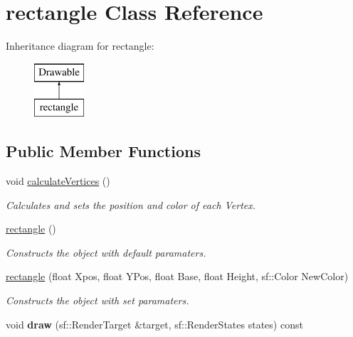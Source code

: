 \hypertarget{classrectangle}{}\section{rectangle Class Reference}
\label{classrectangle}
Inheritance diagram for rectangle\+:\begin{figure}[H]
\begin{center}
\leavevmode
\includegraphics[height=2.000000cm]{classrectangle}
\end{center}
\end{figure}
\subsection*{Public Member Functions}
\begin{DoxyCompactItemize}
\item 
\mbox{\label{classrectangle_a8f448e02e2ffcde7cde242d1486b3ede}} 
void \mbox{\hyperlink{classrectangle_a8f448e02e2ffcde7cde242d1486b3ede}{calculate\+Vertices}} ()
\begin{DoxyCompactList}\small\item\em Calculates and sets the position and color of each Vertex. \end{DoxyCompactList}\item 
\mbox{\label{classrectangle_acdc53c26d992570f77862a76aa6c07e7}} 
\mbox{\hyperlink{classrectangle_acdc53c26d992570f77862a76aa6c07e7}{rectangle}} ()
\begin{DoxyCompactList}\small\item\em Constructs the object with default paramaters. \end{DoxyCompactList}\item 
\mbox{\hyperlink{classrectangle_add36bb7ea2c626fbc9f4e3534567e6b6}{rectangle}} (float Xpos, float Y\+Pos, float Base, float Height, sf\+::\+Color New\+Color)
\begin{DoxyCompactList}\small\item\em Constructs the object with set paramaters. \end{DoxyCompactList}\item 
\mbox{\label{classrectangle_a96d85bad6c91f6188f3752731f4c1aaa}} 
void {\bfseries draw} (sf\+::\+Render\+Target \&target, sf\+::\+Render\+States states) const
\end{DoxyCompactItemize}


